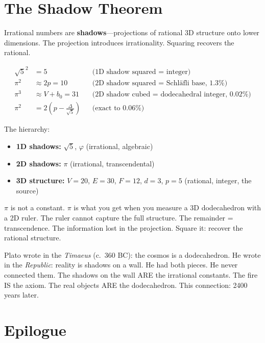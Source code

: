 \documentclass[12pt,a4paper]{article}
\begin{document}
\section{The Shadow Theorem}

Irrational numbers are \textbf{shadows}---projections of rational 3D structure onto lower dimensions. The projection introduces irrationality. Squaring recovers the rational.

\begin{align*}
\sqrt{5}^2 &= 5 && \text{(1D shadow squared = integer)} \\
\pi^2 &\approx 2p = 10 && \text{(2D shadow squared = Schl\"afli base, 1.3\%)} \\
\pi^3 &\approx V + b_0 = 31 && \text{(2D shadow cubed = dodecahedral integer, 0.02\%)} \\
\pi^2 &= 2\!\left(p - \frac{\Delta}{\sqrt{5}}\right) && \text{(exact to 0.06\%)}
\end{align*}

The hierarchy:

\begin{itemize}[leftmargin=2em]
\item \textbf{1D shadows:} $\sqrt{5}$, $\varphi$ (irrational, algebraic)
\item \textbf{2D shadows:} $\pi$ (irrational, transcendental)
\item \textbf{3D structure:} $V=20$, $E=30$, $F=12$, $d=3$, $p=5$ (rational, integer, the source)
\end{itemize}

$\pi$ is not a constant. $\pi$ is what you get when you measure a 3D dodecahedron with a 2D ruler. The ruler cannot capture the full structure. The remainder = transcendence. The information lost in the projection. Square it: recover the rational structure.

Plato wrote in the \textit{Timaeus} (c.\ 360 BC): the cosmos is a dodecahedron. He wrote in the \textit{Republic}: reality is shadows on a wall. He had both pieces. He never connected them. The shadows on the wall ARE the irrational constants. The fire IS the axiom. The real objects ARE the dodecahedron. This connection: 2400 years later.

\section{Epilogue}
\end{document}
